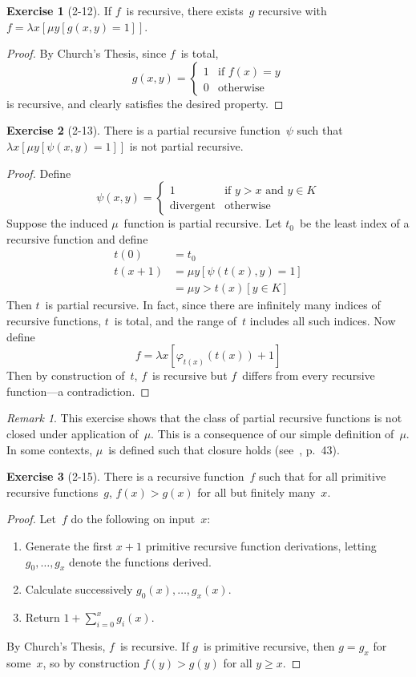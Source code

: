 \documentclass[letterpaper]{article}
\theoremstyle{definition}
\newtheorem*{exer}{Exercise}
\theoremstyle{remark}
\newtheorem*{rmk}{Remark}
\theoremstyle{direction}
\begin{document}
\begin{exer}[2-12]
If $f$~is recursive, there exists~$g$ recursive with $f=\lambda x[\mu y[g(x,y)=1]]$.
\end{exer}
\begin{proof}
By Church's Thesis, since $f$~is total,
$$g(x,y)=
\begin{cases}
1&\text{if }f(x)=y\\
0&\text{otherwise}
\end{cases}$$
is recursive, and clearly satisfies the desired property.
\end{proof}

\begin{exer}[2-13]
There is a partial recursive function~$\psi$ such that $\lambda x[\mu y[\psi(x,y)=1]]$ is not partial recursive.
\end{exer}
\begin{proof}
Define
$$\psi(x,y)=
\begin{cases}
1&\text{if }y>x\text{ and }y\in K\\
\text{divergent}&\text{otherwise}
\end{cases}$$
Suppose the induced $\mu$~function is partial recursive. Let $t_0$~be the least index of a recursive function and define
\begin{align*}
t(0)&=t_0\\
t(x+1)&=\mu y[\psi(t(x),y)=1]\\
	&=\mu y>t(x)[y\in K]
\end{align*}
Then $t$~is partial recursive. In fact, since there are infinitely many indices of recursive functions, $t$~is total, and the range of~$t$ includes all such indices. Now define
$$f=\lambda x[\varphi_{t(x)}(t(x))+1]$$
Then by construction of~$t$, $f$~is recursive but $f$~differs from every recursive function---a contradiction.
\end{proof}

\begin{rmk}
This exercise shows that the class of partial recursive functions is not closed under application of~$\mu$. This is a consequence of our simple definition of~$\mu$. In some contexts, $\mu$~is defined such that closure holds (see~\cite{cutland80}, p.~43).
\end{rmk}

\begin{exer}[2-15]
There is a recursive function~$f$ such that for all primitive recursive functions~$g$, $f(x)>g(x)$ for all but finitely many~$x$.
\end{exer}
\begin{proof}
Let~$f$ do the following on input~$x$:
\begin{enumerate}[itemsep=0pt]
\item Generate the first $x+1$ primitive recursive function derivations, letting $g_0,\ldots,g_x$ denote the functions derived.
\item Calculate successively $g_0(x),\ldots,g_x(x)$.
\item Return $1+\sum_{i=0}^x g_i(x)$.
\end{enumerate}
By Church's Thesis, $f$~is recursive. If $g$~is primitive recursive, then $g=g_x$ for some~$x$, so by construction $f(y)>g(y)$ for all $y\ge x$.
\end{proof}
\end{document}
